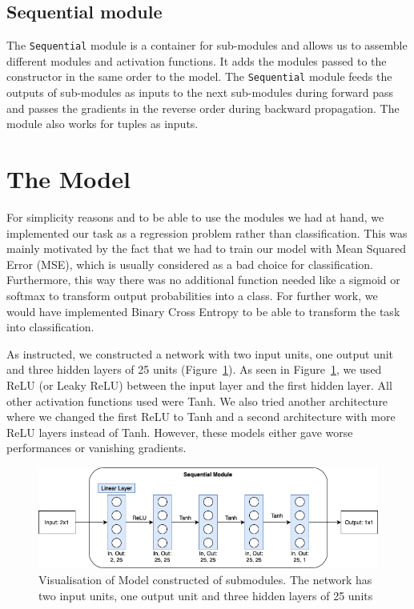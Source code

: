 \documentclass[10pt,conference,compsocconf]{IEEEtran}
\begin{document}
\subsection{Sequential module}
The \texttt{Sequential} module is a container for sub-modules and allows us to assemble different modules and activation functions. It adds the modules passed to the constructor in the same order to the model. The \texttt{Sequential} module feeds the outputs of sub-modules as inputs to the next sub-modules during forward pass and passes the gradients in the reverse order during backward propagation. The module also works for tuples as inputs. 



\section{The Model}
\label{sec:baseline-model}
For simplicity reasons and to be able to use the modules we had at hand, we implemented our task as a regression problem rather than classification. This was mainly motivated by the fact that we had to train our model with Mean Squared Error (MSE), which is usually considered as a bad choice for classification. Furthermore, this way there was no additional function needed like a sigmoid or softmax to transform output probabilities into a class. For further work, we would have implemented Binary Cross Entropy to be able to transform the task into classification. 


As instructed, we constructed a network with two input units, one output unit and three hidden layers of 25 units (Figure~\ref{fig:model}). As seen in Figure~\ref{fig:model}, we used ReLU (or Leaky ReLU) between the input layer and the first hidden layer. All other activation functions used were Tanh. We also tried another architecture where we changed the first ReLU to Tanh and a second architecture with more ReLU layers instead of Tanh. However, these models either gave worse performances or vanishing gradients. 



\begin{figure}[htbp]
  \centering
  \includegraphics[width=\columnwidth]{doc/project2-report/model.png}
  \vspace{-3mm}
  \caption{Visualisation of Model constructed of submodules. The network has  two  input units,  one  output  unit  and  three  hidden  layers  of  25  units}
  \label{fig:model}
\end{figure}
\end{document}
